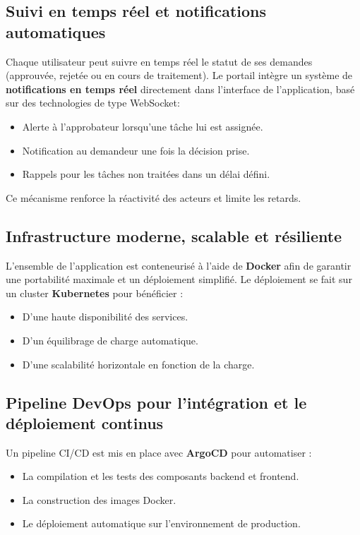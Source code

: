 \subsection*{Suivi en temps réel et notifications automatiques}

Chaque utilisateur peut suivre en temps réel le statut de ses demandes (approuvée, rejetée ou en cours de traitement). Le portail intègre un système de \textbf{notifications en temps réel} directement dans l’interface de l’application, basé sur des technologies de type WebSocket:

\begin{itemize}
    \item Alerte à l'approbateur lorsqu’une tâche lui est assignée.
    \item Notification au demandeur une fois la décision prise.
    \item Rappels pour les tâches non traitées dans un délai défini.
\end{itemize}

Ce mécanisme renforce la réactivité des acteurs et limite les retards.

\subsection*{Infrastructure moderne, scalable et résiliente}

L’ensemble de l’application est conteneurisé à l’aide de \textbf{Docker} afin de garantir une portabilité maximale et un déploiement simplifié. Le déploiement se fait sur un cluster \textbf{Kubernetes} pour bénéficier :
\begin{itemize}
    \item D’une haute disponibilité des services.
    \item D’un équilibrage de charge automatique.
    \item D’une scalabilité horizontale en fonction de la charge.
\end{itemize}

\subsection*{Pipeline DevOps pour l’intégration et le déploiement continus}

Un pipeline CI/CD est mis en place avec \textbf{ArgoCD} pour automatiser :
\begin{itemize}
    \item La compilation et les tests des composants backend et frontend.
    \item La construction des images Docker.
    \item Le déploiement automatique sur l’environnement de production.
\end{itemize}

